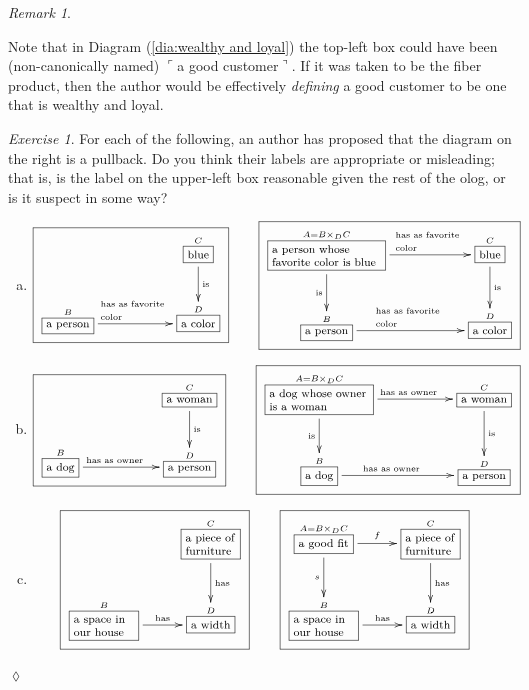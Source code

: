 \documentclass{book}
\def\tn{\textnormal}
\def\hsp{\hspace{.3in}}
\def\rr{\raggedright}
\newcommand{\LA}[2]{\ar[#1]^-{\tn {#2}}}
\newcommand{\LAL}[2]{\ar[#1]_-{\tn {#2}}}
\newcommand{\obox}[3]{\stackrel{#1}{\fbox{\parbox{#2}{#3}}}}
\newcommand{\smbox}[2]{\stackrel{#1}{\fbox{#2}}}
\newcommand{\fakebox}[1]{\tn{$\ulcorner$#1$\urcorner$}}
\theoremstyle{remark}
\newtheorem{remark}[subsubsection]{Remark}
\newtheorem{exc}[subsubsection]{Exercise}
\newenvironment{exercise}{\begin{exc}}{\hspace*{\fill}$\lozenge$\end{exc}}
\theoremstyle{definition}
\def\sexc{\begin{enumerate}[a.)]\setlength{\itemsep}{.1cm}\setlength{\parskip}{.1cm}\item}
\def\next{\item}
\def\endsexc{\end{enumerate}}
\begin{document}
\begin{remark}\label{rem:defining using pullbacks}

Note that in Diagram (\ref{dia:wealthy and loyal}) the top-left box could have been (non-canonically named) \fakebox{a good customer}. If it was taken to be the fiber product, then the author would be effectively {\em defining} a good customer to be one that is wealthy and loyal. 

\end{remark}

\begin{exercise}
For each of the following, an author has proposed that the diagram on the right is a pullback. Do you think their labels are appropriate or misleading; that is, is the label on the upper-left box reasonable given the rest of the olog, or is it suspect in some way?
\sexc\begin{align*}\footnotesize\fbox{\xymatrix{&&\smbox{C}{blue}\LA{d}{is}\\\smbox{B}{a person}\LA{rr}{\parbox{.7in}{\rr has as favorite color}}&&\smbox{D}{a color}}}\hsp&
\footnotesize\fbox{\xymatrixnocompile{\obox{A=B\times_DC}{1.1in}{\rr a person whose favorite color is blue}\LAL{d}{is}\LA{rr}{\parbox{.7in}{\rr has as favorite color}}&&\smbox{C}{blue}\LA{d}{is}\\\smbox{B}{a person}\LA{rr}{\parbox{.7in}{\rr has as favorite color}}&&\smbox{D}{a color}}}
\end{align*}
\next\begin{align*}
\footnotesize\fbox{\xymatrixnocompile{&&\smbox{C}{a woman}\LA{d}{is}\\\smbox{B}{a dog}\LA{rr}{\parbox{.7in}{\rr has as owner}}&&\smbox{D}{a person}}}\hsp&
\footnotesize\fbox{\xymatrixnocompile{\obox{A=B\times_DC}{1in}{\rr a dog whose owner is a woman}\LAL{d}{is}\LA{rr}{\parbox{.7in}{\rr has as owner}}&&\smbox{C}{a woman}\LA{d}{is}\\\smbox{B}{a dog}\LA{rr}{\parbox{.7in}{\rr has as owner}}&&\smbox{D}{a person}}}
\end{align*}
\next\begin{align*}
\footnotesize\fbox{\xymatrixnocompile{&\obox{C}{.5in}{\rr a piece of furniture}\LA{d}{has}\\\obox{B}{.6in}{\rr a space in our house}\LA{r}{has}&\smbox{D}{a width}}}\hsp&
\footnotesize\fbox{\xymatrixnocompile{\obox{A=B\times_DC}{.5in}{\rr a good fit}\LAL{d}{$s$}\LA{r}{$f$}&\obox{C}{.5in}{\rr a piece of furniture}\LA{d}{has}\\\obox{B}{.6in}{\rr a space in our house}\LA{r}{has}&\smbox{D}{a width}}}
\end{align*}
\endsexc
\end{exercise}
\end{document}
